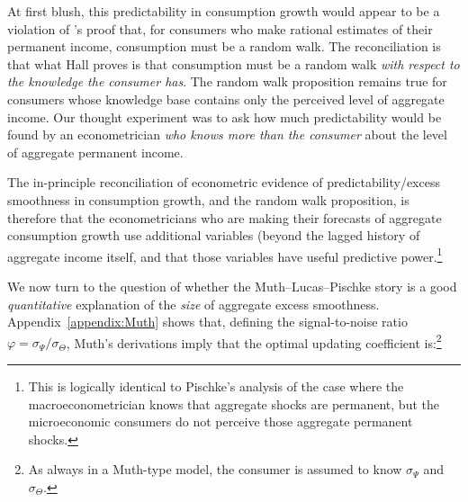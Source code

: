 \documentclass[titlepage]{\econtex}\newcommand{\texname}{cAndCwithStickyE}
\begin{document}
At first blush, this predictability in consumption growth would appear to be a violation of \cite{hallRandomWalk}'s proof that, for consumers who make rational estimates of their permanent income, consumption must be a random walk.  The reconciliation is that what Hall proves is that consumption must be a random walk {\it with respect to the knowledge the consumer has}.  The random walk proposition remains true for consumers whose knowledge base contains only the perceived level of aggregate income.  Our thought experiment was to ask how much predictability would be found by an econometrician {\it who knows more than the consumer} about the level of aggregate permanent income.

The in-principle reconciliation of econometric evidence of predictability/excess smoothness in consumption growth, and the random walk proposition, is therefore that the econometricians who are making their forecasts of aggregate consumption growth use additional variables (beyond the lagged history of aggregate income itself, and that those variables have useful predictive power.\footnote{This is logically identical to Pischke's analysis of the case where the macroeconometrician knows that aggregate shocks are permanent, but the microeconomic consumers do not perceive those aggregate permanent shocks.}

We now turn to the question of whether the Muth--Lucas--Pischke story is a good {\it quantitative} explanation of the {\it size} of aggregate excess smoothness.  Appendix~\ref{appendix:Muth} shows that, defining the signal-to-noise ratio $\varphi=\sigma_{\Psi}/\sigma_{\Theta}$, Muth's derivations imply that the optimal updating coefficient is:\footnote{As always in a Muth-type model, the consumer is assumed to know $\sigma_{\Psi}$ and $\sigma_{\Theta}$.}  

\providecommand{\PischkePi}{0.83}
\providecommand{\PischkePiCancel}{0.17}
 \providecommand{\fromFile}{false}
 \providecommand{\FileOrNot}{\ifthenelse{\boolean{\fromFile}}}
\end{document}
